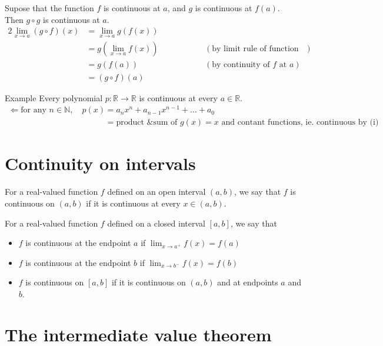 \documentclass{report}
\begin{document}
	Supose that the function $f$ is continuous at $a$, and $g$ is continuous at $f(a)$. Then $g \circ g$ is continuous at $a$.
	\begin{alignat*}{2}
		\lim_{x \to a} (g \circ f)(x) &= \lim_{x \to a} g(f(x)) \\
									  &= g\!\left( \lim_{x \to a} f(x) \right) \qquad \qquad	&& (\text{by limit rule of function composition}) \\
									  &= g(f(a))												&& (\text{by continuity of $f$ at $a$}) \\
									  &= (g \circ f)(a)
	\end{alignat*}

	\begin{question}{Example}
		Every polynomial $p: \mathbb{R} \rightarrow \mathbb{R}$ is continuous at every $a \in \mathbb{R}$.
		\begin{align*}
			\Leftarrow \text{for any } n \in \mathbb{N}, \quad p(x) &= a_n x^n + a_{n-1} x^{n-1} + \dots + a_0	\\
																	&= \text{product \& sum of } g(x) = x \text{ and contant functions, ie. continuous by (i)}
		\end{align*}
	\end{question}

\section{Continuity on intervals}

	For a real-valued function $f$ defined on an open interval $(a,b)$, we say that $f$ is continuous on $(a,b)$ if it is continuous at every $x \in (a,b)$.

	For a real-valued function $f$ defined on a closed interval $[a,b]$, we say that
		\begin{itemize}
			\item $f$ is continuous at the endpoint $a$ if $\displaystyle\lim_{x\to a^+} f(x) = f(a)$
			\item $f$ is continuous at the endpoint $b$ if $\displaystyle\lim_{x\to b^-} f(x) = f(b)$
			\item $f$ is continuous on $[a,b]$ if it is continuous on $(a,b)$ and at endpoints $a$ and $b$.
		\end{itemize}

\section{The intermediate value theorem}
\end{document}
